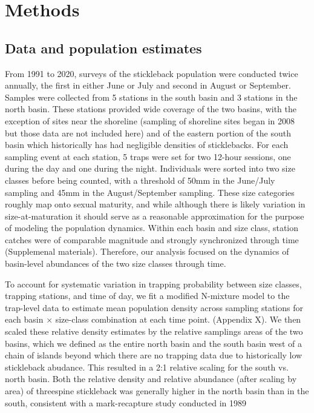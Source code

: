 \section*{Methods} 



\subsection*{Data and population estimates} 

From 1991 to 2020, surveys of the stickleback population were conducted twice annually, 
the first in either June or July and second in August or September. 
Samples were collected from 5 stations in the south basin and 3 stations in the north basin.
These stations provided wide coverage of the two basins, 
with the exception of sites near the shoreline 
(sampling of shoreline sites began in 2008 but those data are not included here)
and of the eastern portion of the south basin which historically has had negligible 
densities of sticklebacks.
For each sampling event at each station, 
5 traps were set for two 12-hour sessions, 
one during the day and one during the night.
Individuals were sorted into two size classes before being counted,
with a threshold of 50mm in the June/July sampling and 45mm in the August/September sampling.
These size categories roughly map onto sexual maturity,
and while although there is likely variation in size-at-maturation
it should serve as a reasonable approximation for the purpose 
of modeling the population dynamics.
Within each basin and size class, 
station catches were of comparable magnitude and 
strongly synchronized through time (Supplemenal materials).
Therefore, our analysis focused on the dynamics of basin-level abundances
of the two size classes through time.

To account for systematic variation in trapping probability between size classes,
trapping stations, and time of day, 
we fit a modified N-mixture model \citep{royle2004}
to the trap-level data to estimate mean population density across sampling stations 
for each basin $\times$ size-class combination at each time point.
(Appendix X). 
We then scaled these relative density estimates by the relative samplings areas 
of the two basins, 
which we defined as the entire north basin and the south basin west of a chain
of islands beyond which there are no trapping data 
due to historically low stickleback abudance.
This resulted in a 2:1 relative scaling for the south vs. north basin.
Both the relative density and relative abundance (after scaling by area) of threespine
stickleback was generally higher in the north basin than in the south,
consistent with a mark-recapture study conducted in 1989 \citep{gislason1998}



